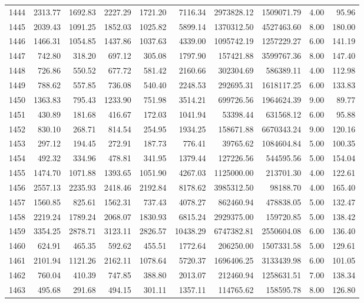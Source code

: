 \begin{tabular}{lrrrrrrrrr}
1444 & 2313.77 & 1692.83 & 2227.29 & 1721.20 & 7116.34 & 2973828.12 & 1509071.79 & 4.00 & 95.96 \\
1445 & 2039.43 & 1091.25 & 1852.03 & 1025.82 & 5899.14 & 1370312.50 & 4527463.60 & 8.00 & 180.00 \\
1446 & 1466.31 & 1054.85 & 1437.86 & 1037.63 & 4339.00 & 1095742.19 & 1257229.27 & 6.00 & 141.19 \\
1447 & 742.80 & 318.20 & 697.12 & 305.08 & 1797.90 & 157421.88 & 3599767.36 & 8.00 & 147.40 \\
1448 & 726.86 & 550.52 & 677.72 & 581.42 & 2160.66 & 302304.69 & 586389.11 & 4.00 & 112.98 \\
1449 & 788.62 & 557.85 & 736.08 & 540.40 & 2248.53 & 292695.31 & 1618117.25 & 6.00 & 133.83 \\
1450 & 1363.83 & 795.43 & 1233.90 & 751.98 & 3514.21 & 699726.56 & 1964624.39 & 9.00 & 89.77 \\
1451 & 430.89 & 181.68 & 416.67 & 172.03 & 1041.94 & 53398.44 & 631568.12 & 6.00 & 95.88 \\
1452 & 830.10 & 268.71 & 814.54 & 254.95 & 1934.25 & 158671.88 & 6670343.24 & 9.00 & 120.16 \\
1453 & 297.12 & 194.45 & 272.91 & 187.73 & 776.41 & 39765.62 & 1084604.84 & 5.00 & 100.35 \\
1454 & 492.32 & 334.96 & 478.81 & 341.95 & 1379.44 & 127226.56 & 544595.56 & 5.00 & 154.04 \\
1455 & 1474.70 & 1071.88 & 1393.65 & 1051.90 & 4267.03 & 1125000.00 & 213701.30 & 4.00 & 122.61 \\
1456 & 2557.13 & 2235.93 & 2418.46 & 2192.84 & 8178.62 & 3985312.50 & 98188.70 & 4.00 & 165.40 \\
1457 & 1560.85 & 825.61 & 1562.31 & 737.43 & 4078.27 & 862460.94 & 478838.05 & 5.00 & 132.47 \\
1458 & 2219.24 & 1789.24 & 2068.07 & 1830.93 & 6815.24 & 2929375.00 & 159720.85 & 5.00 & 138.42 \\
1459 & 3354.25 & 2878.71 & 3123.11 & 2826.57 & 10438.29 & 6747382.81 & 2550604.08 & 6.00 & 136.40 \\
1460 & 624.91 & 465.35 & 592.62 & 455.51 & 1772.64 & 206250.00 & 1507331.58 & 5.00 & 129.61 \\
1461 & 2101.94 & 1121.26 & 2162.11 & 1078.64 & 5720.37 & 1696406.25 & 3133439.98 & 6.00 & 101.05 \\
1462 & 760.04 & 410.39 & 747.85 & 388.80 & 2013.07 & 212460.94 & 1258631.51 & 7.00 & 138.34 \\
1463 & 495.68 & 291.68 & 494.15 & 301.11 & 1357.11 & 114765.62 & 158595.78 & 8.00 & 126.80 \\

\end{tabular}
